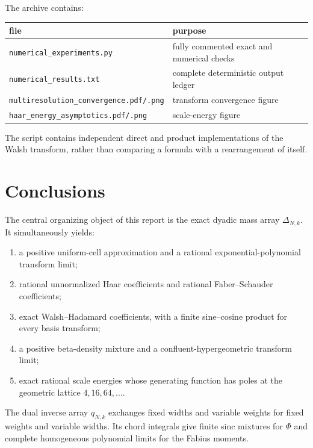 \documentclass[11pt]{article}
\theoremstyle{definition}
\theoremstyle{remark}
\begin{document}
The archive contains:
\begin{center}
\begin{tabular}{@{}ll@{}}
\toprule
file & purpose\\
\midrule
\texttt{numerical\_experiments.py} & fully commented exact and numerical checks\\
\texttt{numerical\_results.txt} & complete deterministic output ledger\\
\texttt{multiresolution\_convergence.pdf/.png} & transform convergence figure\\
\texttt{haar\_energy\_asymptotics.pdf/.png} & scale-energy figure\\
\bottomrule
\end{tabular}
\end{center}
The script contains independent direct and product implementations of the
Walsh transform, rather than comparing a formula with a rearrangement of
itself.

\section{Conclusions}
\label{p3:sec:conclusions}

The central organizing object of this report is the exact dyadic mass array
$\Delta_{N,k}$.  It simultaneously yields:
\begin{enumerate}
\item a positive uniform-cell approximation and a rational exponential-polynomial
      transform limit;
\item rational unnormalized Haar coefficients and rational Faber--Schauder
      coefficients;
\item exact Walsh--Hadamard coefficients, with a finite sine--cosine product for
      every basis transform;
\item a positive beta-density mixture and a confluent-hypergeometric transform
      limit;
\item exact rational scale energies whose generating function has poles at the
      geometric lattice $4,16,64,\ldots$.
\end{enumerate}
The dual inverse array $q_{N,k}$ exchanges fixed widths and variable weights for
fixed weights and variable widths.  Its chord integrals give finite sinc
mixtures for $\Phi$ and complete homogeneous polynomial limits for the Fabius
moments.
\end{document}
